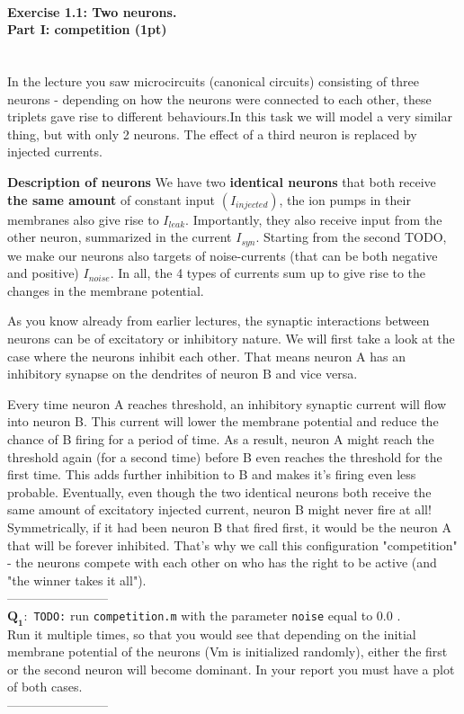 \documentclass[a4paper,11pt]{article}
\newenvironment{exercise}[3]{\paragraph{Exercise #1: #2 (#3pt)}\ \\}{
\medskip}
\newcommand{\question}[2]{\setlength\parindent{10mm}\ \\$\mathbf{Q_#1:}$ #2\ \\}
\begin{document}
%
%
\begin{exercise}{1.1}{Two neurons. \\Part I: competition}{1}
In the lecture you saw microcircuits (canonical circuits) consisting of three neurons - depending on how the neurons were connected to each other, these triplets gave rise to different behaviours.In this task we will model a very similar thing, but with only 2 neurons. The effect of a third neuron is replaced by injected currents.

\textbf{Description of neurons} We have two \textbf{identical neurons} that both receive \textbf{the same amount} of constant input $(I_{injected})$, the ion pumps in their membranes also give rise to $I_{leak}$. Importantly, they also receive input from the other neuron, summarized in the current $I_{syn}$. Starting from the second TODO, we make our neurons also targets of noise-currents (that can be both negative and positive) $I_{noise}$. In all, the 4 types of currents sum up to give rise to the changes in the membrane potential.

As you know already from earlier lectures, the synaptic interactions between neurons can be of excitatory or inhibitory nature. We will first take a look at the case where the neurons inhibit each other. That means neuron A has an inhibitory synapse on the dendrites of neuron B and vice versa. 

Every time neuron A reaches threshold, an inhibitory synaptic current will flow into neuron B. This current will lower the membrane potential and reduce the chance of B firing for a period of time. As a result, neuron A might reach the threshold again (for a second time) before B even reaches the threshold for the first time. This adds further inhibition to B and makes it's firing even less probable. Eventually, even though the two identical neurons both receive the same amount of excitatory injected current, neuron B might never fire at all! Symmetrically, if it had been neuron B that fired first, it would be the neuron A that will be forever inhibited. That's why we call this configuration "competition" - the neurons compete with each other on who has the right to be active (and "the winner takes it all").\\
------------------------
\question{1}{ 
\texttt{TODO:} run \texttt{competition.m} with the parameter \texttt{noise} equal to $0.0$ . \\
Run it multiple times, so that you would see that depending on the initial membrane potential of the neurons (Vm is initialized randomly), either the first or the second neuron will become dominant. In your report you must have a plot of both cases.}
------------------------\\



\end{exercise}
\end{document}
